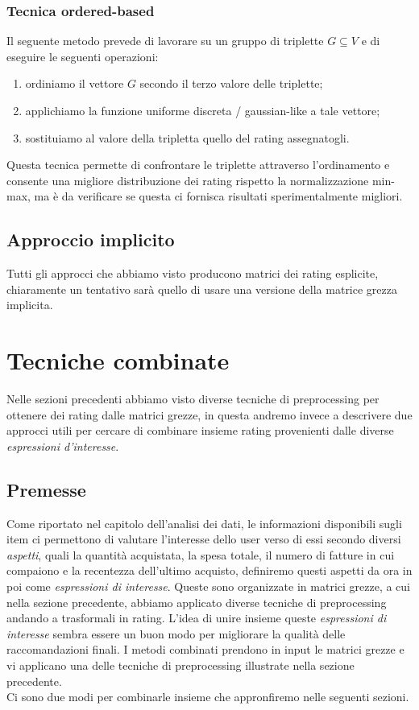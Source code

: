 \subsubsection{Tecnica ordered-based}
Il seguente metodo prevede di lavorare su un gruppo di triplette $G \subseteq V$ e di eseguire le seguenti operazioni:
\begin{enumerate}
    \item ordiniamo il vettore $G$ secondo il terzo valore delle triplette;
    \item applichiamo la funzione uniforme discreta / gaussian-like a tale vettore;
    \item sostituiamo al valore della tripletta quello del rating assegnatogli.
\end{enumerate}

Questa tecnica permette di confrontare le triplette attraverso l'ordinamento e consente una migliore distribuzione dei rating rispetto la normalizzazione min-max, ma è da verificare se questa ci fornisca risultati sperimentalmente migliori.

\subsection{Approccio implicito}
Tutti gli approcci che abbiamo visto producono matrici dei rating esplicite, chiaramente un tentativo sarà quello di usare una versione della matrice grezza implicita.

\section{Tecniche combinate}
Nelle sezioni precedenti abbiamo visto diverse tecniche di preprocessing per ottenere dei rating dalle matrici grezze, in questa andremo invece a descrivere due approcci utili per cercare di combinare insieme rating provenienti dalle diverse \textit{espressioni d'interesse}.
\subsection{Premesse}
Come riportato nel capitolo dell'analisi dei dati, le informazioni disponibili sugli item ci permettono di valutare l'interesse dello user verso di essi secondo diversi \textit{aspetti}, quali la quantità acquistata, la spesa totale, il numero di fatture in cui compaiono e la recentezza dell'ultimo acquisto, definiremo questi aspetti da ora in poi come \textit{espressioni di interesse}.
Queste sono organizzate in matrici grezze, a cui nella sezione precedente, abbiamo applicato diverse tecniche di preprocessing andando a trasformali in rating. L'idea di unire insieme queste \textit{espressioni di interesse} sembra essere un buon modo per migliorare la qualità delle raccomandazioni finali.
I metodi combinati prendono in input le matrici grezze e vi applicano una delle tecniche di preprocessing illustrate nella sezione precedente.\\
Ci sono due modi per combinarle insieme che appronfiremo nelle seguenti sezioni.

